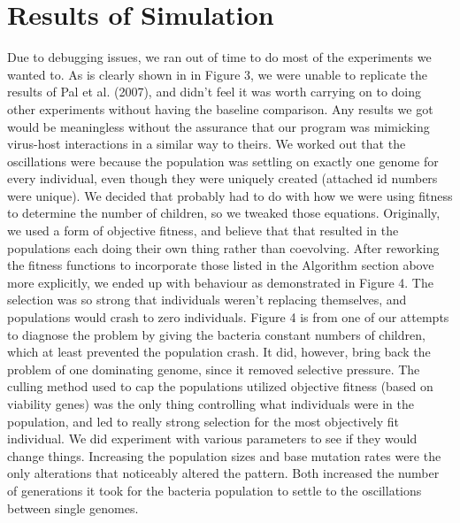 \documentclass[11pt, oneside]{article}
\begin{document}
\section{Results of Simulation}
Due to debugging issues, we ran out of time to do most of the experiments we wanted to. As is clearly shown in in Figure 3, we were unable to replicate the results of Pal et al. (2007), and didn't feel it was worth carrying on to doing other experiments without having the baseline comparison. Any results we got would be meaningless without the assurance that our program was mimicking virus-host interactions in a similar way to theirs. We worked out that the oscillations were because the population was settling on exactly one genome for every individual, even though they were uniquely created (attached id numbers were unique). We decided that probably had to do with how we were using fitness to determine the number of children, so we tweaked those equations. Originally, we used a form of objective fitness, and believe that that resulted in the populations each doing their own thing rather than coevolving. After reworking the fitness functions to incorporate those listed in the Algorithm section above more explicitly, we ended up with behaviour as demonstrated in Figure 4. The selection was so strong that individuals weren't replacing themselves, and populations would crash to zero individuals. Figure 4 is from one of our attempts to diagnose the problem by giving the bacteria constant numbers of children, which at least prevented the population crash. It did, however, bring back the problem of one dominating genome, since it removed selective pressure. The culling method used to cap the populations utilized objective fitness (based on viability genes) was the only thing controlling what individuals were in the population, and led to really strong selection for the most objectively fit individual. We did experiment with various parameters to see if they would change things. Increasing the population sizes and base mutation rates were the only alterations that noticeably altered the pattern. Both increased the number of generations it took for the bacteria population to settle to the oscillations between single genomes. 
\end{document}
